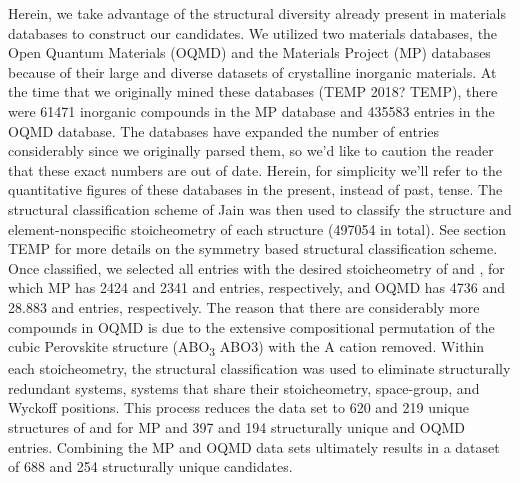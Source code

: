 Herein, we take advantage of the structural diversity already present in materials databases to construct our candidates.
%
We utilized two materials databases, the Open Quantum Materials (OQMD) and the Materials Project (MP) databases because of their large and diverse datasets of crystalline inorganic materials.
%
At the time that we originally mined these databases (TEMP 2018? TEMP), there were \num{61471} inorganic compounds in the MP database and \num{435583} entries in the OQMD database.
%
The databases have expanded the number of entries considerably since we originally parsed them, so we'd like to caution the reader that these exact numbers are out of date.
%
Herein, for simplicity we'll refer to the quantitative figures of these databases in the present, instead of past, tense.
%
The structural classification scheme of Jain  \cite{Jain2018} was then used to classify the structure and element-nonspecific stoicheometry of each structure (\num{497054} in total).
%
See section TEMP for more details on the symmetry based structural classification scheme.
%
Once classified, we selected all entries with the desired stoicheometry of \ABtwo and \ABthree,
for which MP has \num{2424} and \num{2341} \ABtwo and \ABthree entries, respectively,
and OQMD has \num{4736} and \num{28,883} \ABtwo and \ABthree entries, respectively.
%
The reason that there are considerably more \ABthree compounds in OQMD is due to the extensive compositional permutation of the cubic Perovskite structure (ABO\textsubscript{3} ABO3) with the A cation removed.
%
Within each stoicheometry, the structural classification was used to eliminate structurally redundant systems,  systems that share their stoicheometry, space-group, and Wyckoff positions.
%
This process reduces the data set to \num{620} and \num{219} unique structures of \ABtwo and \ABthree for MP and \num{397} and \num{194} structurally unique \ABtwo and \ABthree OQMD entries.
%
Combining the MP and OQMD data sets ultimately results in a dataset of \num{688} \ABtwo and \num{254} \ABthree structurally unique candidates.
%



